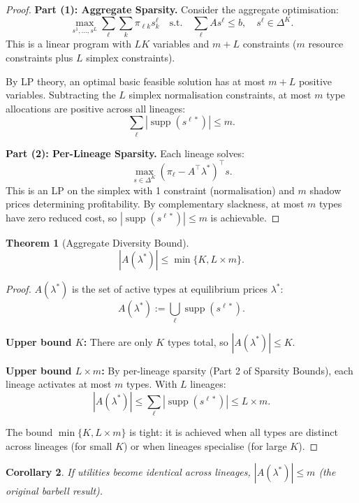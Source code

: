 \documentclass[12pt]{article}
\newtheorem{theorem}{Theorem}[section]
\newtheorem{corollary}[theorem]{Corollary}
\DeclareMathOperator{\supp}{supp}
\begin{document}
\begin{proof}
\textbf{Part (1): Aggregate Sparsity.}
Consider the aggregate optimisation:
\[
\max_{s^1, \ldots, s^L} \sum_\ell \sum_k \pi_{\ell k} s_k^\ell \quad \text{s.t.} \quad \sum_\ell A s^\ell \leq b, \quad s^\ell \in \Delta^K.
\]
This is a linear program with $LK$ variables and $m + L$ constraints ($m$ resource constraints plus $L$ simplex constraints).

By LP theory, an optimal basic feasible solution has at most $m + L$ positive variables. Subtracting the $L$ simplex normalisation constraints, at most $m$ type allocations are positive across all lineages:
\[
\sum_\ell |\supp(s^{\ell*})| \leq m.
\]

\textbf{Part (2): Per-Lineage Sparsity.}
Each lineage solves:
\[
\max_{s \in \Delta^K} (\pi_\ell - A^\top \lambda^*)^\top s.
\]
This is an LP on the simplex with 1 constraint (normalisation) and $m$ shadow prices determining profitability. By complementary slackness, at most $m$ types have zero reduced cost, so $|\supp(s^{\ell*})| \leq m$ is achievable.
\end{proof}

\begin{theorem}[Aggregate Diversity Bound]
\[
|A(\lambda^*)| \leq \min\{K, L \times m\}.
\]
\end{theorem}

\begin{proof}
$A(\lambda^*)$ is the set of active types at equilibrium prices $\lambda^*$:
\[
A(\lambda^*) := \bigcup_\ell \supp(s^{\ell*}).
\]

\textbf{Upper bound $K$:} There are only $K$ types total, so $|A(\lambda^*)| \leq K$.

\textbf{Upper bound $L \times m$:} By per-lineage sparsity (Part 2 of Sparsity Bounds), each lineage activates at most $m$ types. With $L$ lineages:
\[
|A(\lambda^*)| \leq \sum_\ell |\supp(s^{\ell*})| \leq L \times m.
\]

The bound $\min\{K, L \times m\}$ is tight: it is achieved when all types are distinct across lineages (for small $K$) or when lineages specialise (for large $K$).
\end{proof}

\begin{corollary}
If utilities become identical across lineages, $|A(\lambda^*)| \leq m$ (the original barbell result).
\end{corollary}

\end{document}
